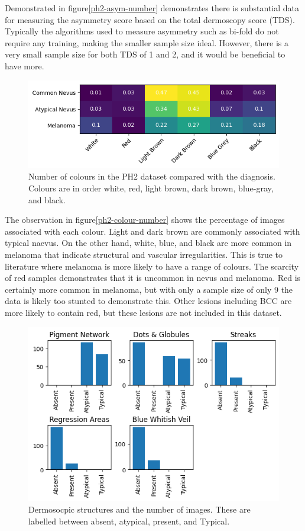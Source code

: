Demonstrated in figure\ref{ph2-asym-number} demonstrates there is substantial data for measuring the asymmetry score based on the total dermoscopy score (TDS). Typically the algorithms used to measure asymmetry such as bi-fold do not require any training, making the smaller sample size ideal. However, there is a very small sample size for both TDS of 1 and 2, and it would be beneficial to have more.

\begin{figure}
	\centering
	\includegraphics[scale=0.75]{images/ph2/ph2-colour-number-heat.png}
	\caption{Number of colours in the PH2 dataset compared with the diagnosis. Colours are in order white, red, light brown, dark brown, blue-gray, and black.}
\end{figure}\label{ph2-colour-number}

The observation in figure\ref{ph2-colour-number} shows the percentage of images associated with each colour. Light and dark brown are commonly associated with typical naevus. On the other hand, white, blue, and black are more common in melanoma that indicate structural and vascular irregularities. This is true to literature where melanoma is more likely to have a range of colours. The scarcity of red samples demonstrates that it is uncommon in nevus and melanoma. Red is certainly more common in melanoma, but with only a sample size of only 9 the data is likely too stunted to demonstrate this. Other lesions including BCC are more likely to contain red\cite{}, but these lesions are not included in this dataset.

\begin{figure}
	\centering
	\includegraphics[scale=0.75]{images/ph2/ph2-dermo-number.png}
	\caption{Dermosocpic structures and the number of images. These are labelled between absent, atypical, present, and Typical.}
\end{figure}\label{ph2-dermo-number}

